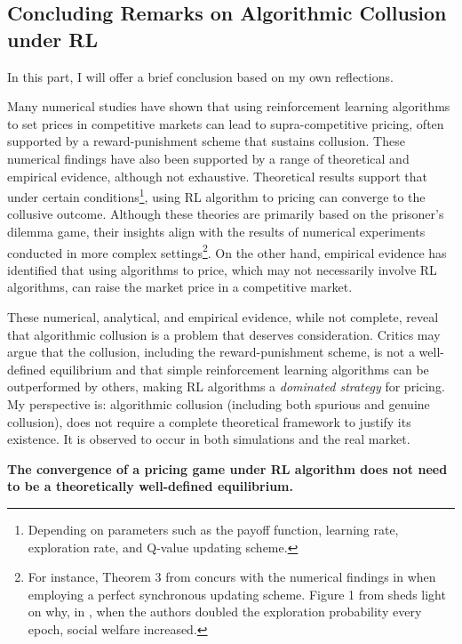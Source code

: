 \documentclass[mnsc,nonblindrev]{workingpaper}
\begin{document}
\subsection{Concluding Remarks on Algorithmic Collusion under RL}
\label{subsec:remark}

In this part, I will offer a brief conclusion based on my own reflections.

Many numerical studies have shown that using reinforcement learning algorithms to set prices in competitive markets can lead to supra-competitive pricing, often supported by a reward-punishment scheme that sustains collusion. These numerical findings have also been supported by a range of theoretical and empirical evidence, although not exhaustive. Theoretical results support that under certain conditions\footnote{Depending on parameters such as the payoff function, learning rate, exploration rate, and Q-value updating scheme.}, using RL algorithm to pricing can converge to the collusive outcome. Although these theories are primarily based on the prisoner’s dilemma game, their insights align with the results of numerical experiments conducted in more complex settings\footnote{For instance, Theorem 3 from \cite{banchio2022artificial} concurs with the numerical findings in \cite{asker2023impact} when employing a perfect synchronous updating scheme. Figure 1 from \cite{den2022artificial} sheds light on why, in \cite{abada2023artificial}, when the authors doubled the exploration probability every epoch, social welfare increased.}. On the other hand, empirical evidence has identified that using algorithms to price, which may not necessarily involve RL algorithms, can raise the market price in a competitive market.

These numerical, analytical, and empirical evidence, while not complete, reveal that algorithmic collusion is a problem that deserves consideration. Critics may argue that the collusion, including the reward-punishment scheme, is not a well-defined equilibrium and that simple reinforcement learning algorithms can be outperformed by others, making RL algorithms a \textit{dominated strategy} for pricing. My perspective is: algorithmic collusion (including both spurious and genuine collusion), does not require a complete theoretical framework to justify its existence. It is observed to occur in both simulations and the real market.

\begin{center}
    \textbf{The convergence of a pricing game under RL algorithm does not need to be a theoretically well-defined equilibrium.} 
\end{center}
\end{document}
